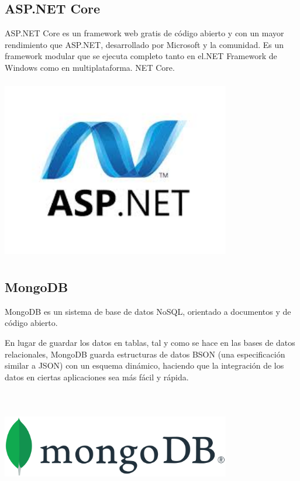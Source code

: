 \documentclass[12pt,letterpaper]{article}
\begin{document}
\subsection{ASP.NET Core}

ASP.NET Core es un framework web gratis de código abierto y con un mayor rendimiento que ASP.NET, desarrollado por Microsoft y la comunidad. Es un framework modular que se ejecuta completo tanto en el.NET Framework de Windows como en multiplataforma. NET Core.
\begin{center}
    \includegraphics[width=10cm, height=8cm]{img/asp.jpg}  
\end{center}
\subsection{MongoDB}

MongoDB es un sistema de base de datos NoSQL, orientado a documentos y de código abierto.

En lugar de guardar los datos en tablas, tal y como se hace en las bases de datos relacionales, MongoDB guarda estructuras de datos BSON (una especificación similar a JSON) con un esquema dinámico, haciendo que la integración de los datos en ciertas aplicaciones sea más fácil y rápida. 
\begin{center}
    \includegraphics[width=10cm, height=5cm]{img/mongo.png}  
\end{center}
\end{document}

